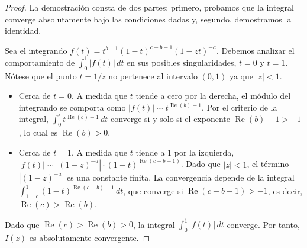 \documentclass[12pt,a4paper]{book}
\renewcommand{\Re}{\operatorname{Re}}
\begin{document}
\begin{proof}
La demostración consta de dos partes: primero, probamos que la integral converge absolutamente bajo las condiciones dadas y, segundo, demostramos la identidad.

Sea el integrando $f(t) = t^{b-1} (1-t)^{c-b-1} (1-zt)^{-a}$. Debemos analizar el comportamiento de $\int_0^1 |f(t)| \, dt$ en sus posibles singularidades, $t=0$ y $t=1$. Nótese que el punto $t = 1/z$ no pertenece al intervalo $(0,1)$ ya que $|z|<1$.
\begin{itemize}
    \item Cerca de $t=0$. A medida que $t$ tiende a cero por la derecha, el módulo del integrando se comporta como $|f(t)| \sim t^{\Re(b)-1}$. Por el criterio de la integral, $\int_0^\epsilon t^{\Re(b)-1} \, dt$ converge si y solo si el exponente $\Re(b)-1 > -1$, lo cual es $\Re(b) > 0$.
    \item Cerca de $t=1$. A medida que $t$ tiende a $1$ por la izquierda, $|f(t)| \sim |(1-z)^{-a}| \cdot (1-t)^{\Re(c-b-1)}$. Dado que $|z|<1$, el término $|(1-z)^{-a}|$ es una constante finita. La convergencia depende de la integral $\int_{1-\epsilon}^1 (1-t)^{\Re(c-b)-1} \, dt$, que converge si $\Re(c-b-1) > -1$, es decir, $\Re(c) > \Re(b)$.
\end{itemize}
Dado que $\Re(c) > \Re(b) > 0$, la integral $\int_0^1 |f(t)| \, dt$ converge. Por tanto, $I(z)$ es absolutamente convergente.


\end{proof}
\end{document}
